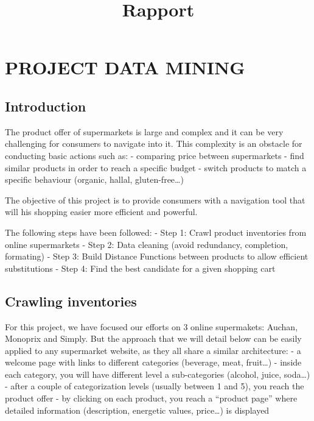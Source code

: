 \documentclass{article}
\title{Rapport}
\begin{document}
    
    
    \maketitle
    
    

    

    \section{PROJECT DATA MINING}



    \subsection{Introduction}


    The product offer of supermarkets is large and complex and it can be
very challenging for consumers to navigate into it. This complexity is
an obstacle for conducting basic actions such as: - comparing price
between supermarkets - find similar products in order to reach a
specific budget - switch products to match a specific behaviour
(organic, hallal, gluten-free\ldots{})

The objective of this project is to provide consumers with a navigation
tool that will his shopping easier more efficient and powerful.

The following steps have been followed: - Step 1: Crawl product
inventories from online supermarkets - Step 2: Data cleaning (avoid
redundancy, completion, formating) - Step 3: Build Distance Functions
between products to allow efficient substitutions - Step 4: Find the
best candidate for a given shopping cart


    \subsection{Crawling inventories}


    For this project, we have focused our efforts on 3 online supermakets:
Auchan, Monoprix and Simply. But the approach that we will detail below
can be easily applied to any supermarket website, as they all share a
similar architecture: - a welcome page with links to different
categories (beverage, meat, fruit\ldots{}) - inside each category, you
will have different level a sub-categories (alcohol, juice,
soda\ldots{}) - after a couple of categorization levels (usually between
1 and 5), you reach the product offer - by clicking on each product, you
reach a ``product page'' where detailed information (description,
energetic values, price\ldots{}) is displayed
\end{document}

